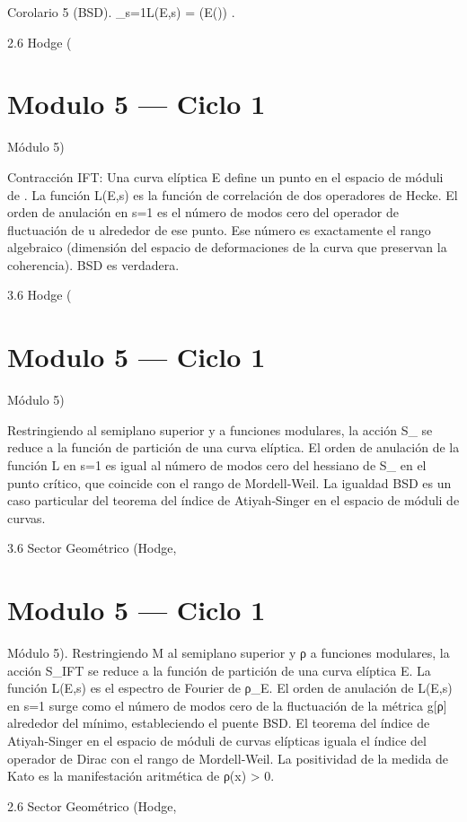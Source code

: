 \documentclass[12pt,twoside]{book}
\begin{document}
Corolario 5 (BSD).  _{s=1}L(E,s) = (E()) .

2.6 Hodge (

\chapter{Modulo 5 — Ciclo 1}
Módulo 5)

Contracción IFT: Una curva elíptica  E  define un punto en el espacio de móduli de  \rho . La función  L(E,s)  es la función de correlación de dos operadores de Hecke. El orden de anulación en  s=1  es el número de modos cero del operador de fluctuación de  u  alrededor de ese punto. Ese número es exactamente el rango algebraico (dimensión del espacio de deformaciones de la curva que preservan la coherencia). BSD es verdadera.

3.6 Hodge (

\chapter{Modulo 5 — Ciclo 1}
Módulo 5)

Restringiendo    al semiplano superior y  \rho  a funciones modulares, la acción  S_{}  se reduce a la función de partición de una curva elíptica. El orden de anulación de la función L en  s=1  es igual al número de modos cero del hessiano de  S_{}  en el punto crítico, que coincide con el rango de Mordell‑Weil. La igualdad BSD es un caso particular del teorema del índice de Atiyah‑Singer en el espacio de móduli de curvas.

3.6 Sector Geométrico (Hodge, 

\chapter{Modulo 5 — Ciclo 1}
Módulo 5).
Restringiendo M al semiplano superior y ρ a funciones modulares, la acción S_IFT se reduce a la función de partición de una curva elíptica E. La función L(E,s) es el espectro de Fourier de ρ_E. El orden de anulación de L(E,s) en s=1 surge como el número de modos cero de la fluctuación de la métrica g[ρ] alrededor del mínimo, estableciendo el puente BSD. El teorema del índice de Atiyah‑Singer en el espacio de móduli de curvas elípticas iguala el índice del operador de Dirac con el rango de Mordell‑Weil. La positividad de la medida de Kato es la manifestación aritmética de ρ(x) > 0.

2.6 Sector Geométrico (Hodge, 
\end{document}
